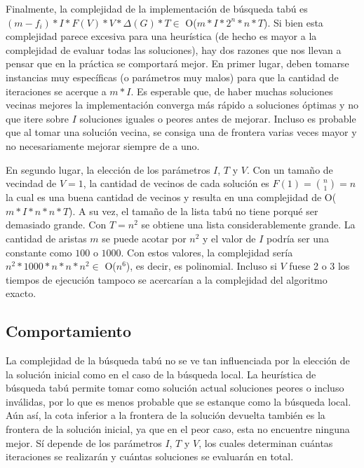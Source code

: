 \par{Finalmente, la complejidad de la implementación de búsqueda tabú es\\
$(m-f_i)*I * F(V) * V*\Delta(G) * T \in$ O($m*I*2^n*n*T$). Si bien esta
complejidad parece excesiva para una heurística (de hecho es mayor a la
complejidad de evaluar todas las soluciones), hay dos razones que nos llevan a
pensar que en la práctica se comportará mejor. En primer lugar, deben tomarse
instancias muy específicas (o parámetros muy malos) para que la cantidad de
iteraciones se acerque a $m*I$. Es esperable que, de haber muchas soluciones
vecinas mejores la implementación converga más rápido a soluciones óptimas y
no que itere sobre $I$ soluciones iguales o peores antes de mejorar. Incluso
es probable que al tomar una solución vecina, se consiga una de frontera varias
veces mayor y no necesariamente mejorar siempre de a uno.}\\

\par{En segundo lugar, la elección de los parámetros $I$, $T$ y $V$.
Con un tamaño de vecindad de $V = 1$, la cantidad de vecinos de cada solución es
$F(1) = \binom{n}{1} = n$ la cual es una buena cantidad de vecinos y
resulta en una complejidad de O($m*I*n*n*T$). A su vez, el tamaño de la lista
tabú no tiene porqué ser demasiado grande. Con $T = n^2$ se obtiene una
lista considerablemente grande. La cantidad de aristas $m$ se puede acotar por
$n^2$ y el valor de $I$ podría ser una constante como $100$ o $1000$. Con estos
valores, la complejidad sería $n^2 * 1000 * n * n * n^2 \in$ O($n^6$), es decir,
es polinomial. Incluso si $V$ fuese 2 o 3 los tiempos de ejecución tampoco se
acercarían a la complejidad del algoritmo exacto.}

\subsection{Comportamiento}

\par{La complejidad de la búsqueda tabú no se ve tan influenciada por la
elección de la solución inicial como en el caso de la búsqueda local. La
heurística de búsqueda tabú permite tomar como solución actual soluciones
peores o incluso inválidas, por lo que es menos probable que se estanque como
la búsqueda local. Aún así, la cota inferior a la frontera de la solución
devuelta también es la frontera de la solución inicial, ya que en el peor caso,
esta no encuentre ninguna mejor. Sí depende de los parámetros $I$, $T$ y $V$, los
cuales determinan cuántas iteraciones se realizarán y cuántas soluciones se
evaluarán en total.}

